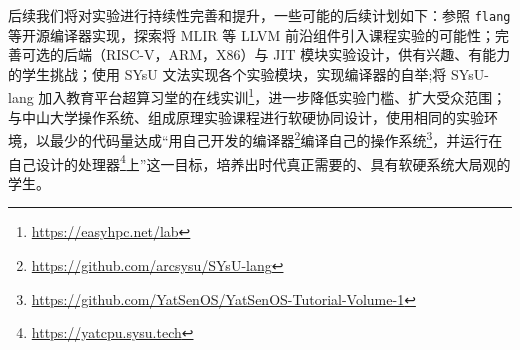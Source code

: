 \documentclass{SCIS2020cn}
\begin{document}
后续我们将对实验进行持续性完善和提升，一些可能的后续计划如下：参照 \texttt{flang} 等开源编译器实现，探索将 MLIR 等 LLVM 前沿组件引入课程实验的可能性；完善可选的后端（RISC-V，ARM，X86）与 JIT 模块实验设计，供有兴趣、有能力的学生挑战；使用 SYsU 文法实现各个实验模块，实现编译器的自举;将 SYsU-lang 加入教育平台超算习堂的在线实训\footnote{\url{https://easyhpc.net/lab}}，进一步降低实验门槛、扩大受众范围；与中山大学操作系统、组成原理实验课程进行软硬协同设计，使用相同的实验环境，以最少的代码量达成“用自己开发的编译器\footnote{\url{https://github.com/arcsysu/SYsU-lang}}编译自己的操作系统\footnote{\url{https://github.com/YatSenOS/YatSenOS-Tutorial-Volume-1}}，并运行在自己设计的处理器\footnote{\url{https://yatcpu.sysu.tech}}上”这一目标，培养出时代真正需要的、具有软硬系统大局观的学生。


\end{document}
